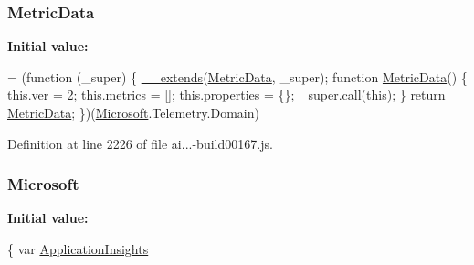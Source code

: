 \subsubsection[{\texorpdfstring{Metric\+Data}{MetricData}}]{ Metric\+Data}\hypertarget{obj_2_release_2_package_2_package_tmp_2_scripts_2ai_80_822_89-build00167_8js_a2dc65d060c9e53677015ff1e51b99976}{}\label{obj_2_release_2_package_2_package_tmp_2_scripts_2ai_80_822_89-build00167_8js_a2dc65d060c9e53677015ff1e51b99976}
{\bfseries Initial value\+:}
\begin{DoxyCode}
= (\textcolor{keyword}{function} (\_super) \{
        \hyperlink{obj_2_release_2_package_2_package_tmp_2_scripts_2ai_80_822_89-build00167_8js_ac09f4951ac4b25df0272d4e78ff85ae0}{\_\_extends}(\hyperlink{obj_2_release_2_package_2_package_tmp_2_scripts_2ai_80_822_89-build00167_8js_a2dc65d060c9e53677015ff1e51b99976}{MetricData}, \_super);
        \textcolor{keyword}{function} \hyperlink{obj_2_release_2_package_2_package_tmp_2_scripts_2ai_80_822_89-build00167_8js_a2dc65d060c9e53677015ff1e51b99976}{MetricData}() \{
            this.ver = 2;
            this.metrics = [];
            this.properties = \{\};
            \_super.call(\textcolor{keyword}{this});
        \}
        \textcolor{keywordflow}{return} \hyperlink{obj_2_release_2_package_2_package_tmp_2_scripts_2ai_80_822_89-build00167_8js_a2dc65d060c9e53677015ff1e51b99976}{MetricData};
    \})(\hyperlink{obj_2_release_2_package_2_package_tmp_2_scripts_2ai_80_822_89-build00167_8js_af7b21097393c8dc2ece8949358ff0e27}{Microsoft}.Telemetry.Domain)
\end{DoxyCode}


Definition at line 2226 of file ai...-\/build00167.\+js.

\subsubsection[{\texorpdfstring{Microsoft}{Microsoft}}]{\setlength{\rightskip}{0pt plus 5cm}Microsoft}\hypertarget{obj_2_release_2_package_2_package_tmp_2_scripts_2ai_80_822_89-build00167_8js_af7b21097393c8dc2ece8949358ff0e27}{}\label{obj_2_release_2_package_2_package_tmp_2_scripts_2ai_80_822_89-build00167_8js_af7b21097393c8dc2ece8949358ff0e27}
{\bfseries Initial value\+:}
\begin{DoxyCode}
\{
    var \hyperlink{obj_2_release_2_package_2_package_tmp_2_scripts_2ai_80_822_89-build00167_8js_aa415ef4f8cdd699689ef4b61db7656d8}{ApplicationInsights}
\end{DoxyCode}


